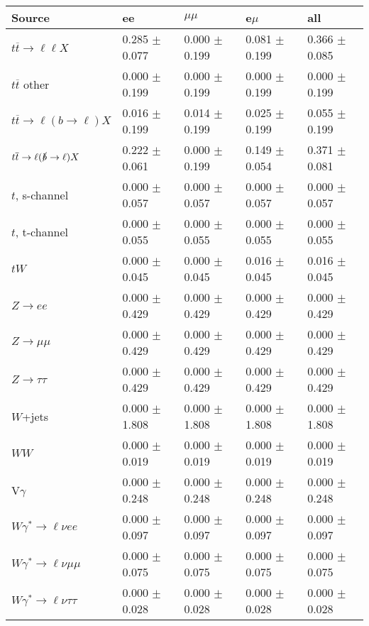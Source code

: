 \begin{tabular}{l | l l l l}
\hline\hline
 Source  &  ee  &  $\mu\mu$  &  e$\mu$  &  all \\
\hline
$t\overline{t}\rightarrow \ell\ell X$ &  0.285 $\pm$  0.077 &  0.000 $\pm$  0.199 &  0.081 $\pm$  0.199 &  0.366 $\pm$  0.085\\
$t\overline{t}$ other &  0.000 $\pm$  0.199 &  0.000 $\pm$  0.199 &  0.000 $\pm$  0.199 &  0.000 $\pm$  0.199\\
$t\overline{t}\rightarrow \ell(b\rightarrow \ell)X$ &  0.016 $\pm$  0.199 &  0.014 $\pm$  0.199 &  0.025 $\pm$  0.199 &  0.055 $\pm$  0.199\\
$t\overline{t}\rightarrow \ell(\slashed{b}\rightarrow \ell)X$ &  0.222 $\pm$  0.061 &  0.000 $\pm$  0.199 &  0.149 $\pm$  0.054 &  0.371 $\pm$  0.081\\
\hline
$t$, s-channel &  0.000 $\pm$  0.057 &  0.000 $\pm$  0.057 &  0.000 $\pm$  0.057 &  0.000 $\pm$  0.057\\
$t$, t-channel &  0.000 $\pm$  0.055 &  0.000 $\pm$  0.055 &  0.000 $\pm$  0.055 &  0.000 $\pm$  0.055\\
$tW$ &  0.000 $\pm$  0.045 &  0.000 $\pm$  0.045 &  0.016 $\pm$  0.045 &  0.016 $\pm$  0.045\\
\hline
$Z\rightarrow ee$ &  0.000 $\pm$  0.429 &  0.000 $\pm$  0.429 &  0.000 $\pm$  0.429 &  0.000 $\pm$  0.429\\
$Z\rightarrow\mu\mu$ &  0.000 $\pm$  0.429 &  0.000 $\pm$  0.429 &  0.000 $\pm$  0.429 &  0.000 $\pm$  0.429\\
$Z\rightarrow\tau\tau$ &  0.000 $\pm$  0.429 &  0.000 $\pm$  0.429 &  0.000 $\pm$  0.429 &  0.000 $\pm$  0.429\\
$W$+jets &  0.000 $\pm$  1.808 &  0.000 $\pm$  1.808 &  0.000 $\pm$  1.808 &  0.000 $\pm$  1.808\\
$WW$ &  0.000 $\pm$  0.019 &  0.000 $\pm$  0.019 &  0.000 $\pm$  0.019 &  0.000 $\pm$  0.019\\
\hline
V$\gamma$ &  0.000 $\pm$  0.248 &  0.000 $\pm$  0.248 &  0.000 $\pm$  0.248 &  0.000 $\pm$  0.248\\
$W\gamma^{*}\rightarrow\ell\nu e e$ &  0.000 $\pm$  0.097 &  0.000 $\pm$  0.097 &  0.000 $\pm$  0.097 &  0.000 $\pm$  0.097\\
$W\gamma^{*}\rightarrow\ell\nu\mu\mu$ &  0.000 $\pm$  0.075 &  0.000 $\pm$  0.075 &  0.000 $\pm$  0.075 &  0.000 $\pm$  0.075\\
$W\gamma^{*}\rightarrow\ell\nu\tau\tau$ &  0.000 $\pm$  0.028 &  0.000 $\pm$  0.028 &  0.000 $\pm$  0.028 &  0.000 $\pm$  0.028\\

\end{tabular}

